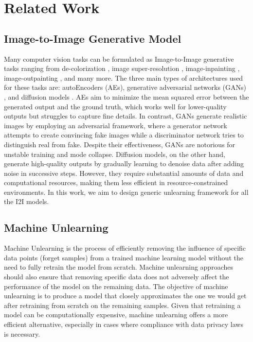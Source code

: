 \section{Related Work}
\label{sec:realted work}

\subsection{Image-to-Image Generative Model}

Many computer vision tasks can be formulated as Image-to-Image generative tasks ranging from de-colorization \cite{saharia2022palette}, image super-resolution \cite{bulat2018learn}, image-inpainting \cite{krishnan2019boundless}, image-outpainting \cite{chang2022maskgit}, and many more. The three main types of architectures used for these tasks are: autoEncoders \cite{alain2014regularized} (AEs), generative adversarial networks (GANs) \cite{goodfellow2020generative}, and diffusion models \cite{ho2020denoising}. AEs aim to minimize the mean squared error between the generated output and the ground truth, which works well for lower-quality outputs but struggles to capture fine details. In contrast, GANs generate realistic images by employing an adversarial framework, where a generator network attempts to create convincing fake images while a discriminator network tries to distinguish real from fake. Despite their effectiveness, GANs are notorious for unstable training and mode collapse. Diffusion models, on the other hand, generate high-quality outputs by gradually learning to denoise data after adding noise in successive steps. However, they require substantial amounts of data and computational resources, making them less efficient in resource-constrained environments. In this work, we aim to design generic unlearning framework for all the I2I models. 

\subsection{Machine Unlearning}

Machine Unlearning \cite{cao2015towards} is the process of efficiently removing the influence of specific data points (forget samples) from a trained machine learning model without the need to fully retrain the model from scratch. Machine unlearning approaches should also ensure that removing specific data does not adversely affect the performance of the model on the remaining data. The objective of machine unlearning is to produce a model that closely approximates the one we would get after retraining from scratch on the remaining samples. Given that retraining a model can be computationally expensive, machine unlearning offers a more efficient alternative, especially in cases where compliance with data privacy laws is necessary.

